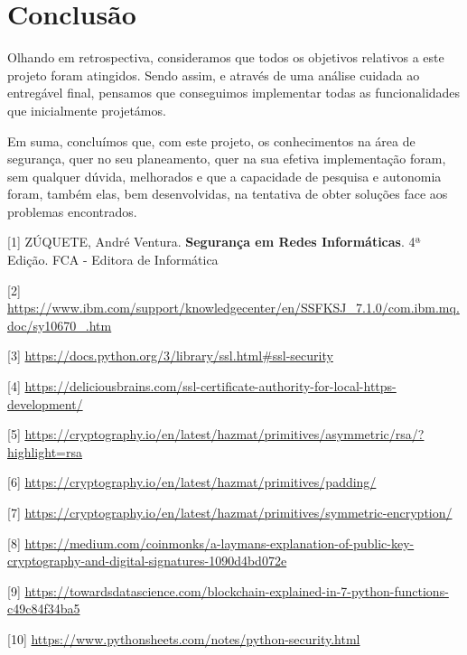 \documentclass[12pt]{article}
\begin{document}
\pagebreak

\section{Conclusão}

\par Olhando em retrospectiva, consideramos que todos os objetivos relativos a este projeto foram atingidos. Sendo assim, e através de uma análise cuidada ao entregável final, pensamos que conseguimos implementar todas as funcionalidades que inicialmente projetámos. 

\par Em suma, concluímos que, com este projeto, os conhecimentos na área de segurança, quer no seu planeamento, quer na sua efetiva implementação foram, sem qualquer dúvida, melhorados e que a capacidade de pesquisa e autonomia foram, também elas, bem desenvolvidas, na tentativa de obter soluções face aos problemas encontrados.

\pagebreak





\vspace{5mm} %


[1] ZÚQUETE, André Ventura. \textbf{Segurança em Redes Informáticas}. 4ª Edição. FCA - Editora de Informática 


[2] \url{https://www.ibm.com/support/knowledgecenter/en/SSFKSJ\_7.1.0/com.ibm.mq.doc/sy10670\_.htm}

[3] \url{https://docs.python.org/3/library/ssl.html#ssl-security}

[4] \url{https://deliciousbrains.com/ssl-certificate-authority-for-local-https-development/}

[5] \url{https://cryptography.io/en/latest/hazmat/primitives/asymmetric/rsa/?highlight=rsa}

[6] \url{https://cryptography.io/en/latest/hazmat/primitives/padding/}

[7] \url{https://cryptography.io/en/latest/hazmat/primitives/symmetric-encryption/}

[8] \url{https://medium.com/coinmonks/a-laymans-explanation-of-public-key-cryptography-and-digital-signatures-1090d4bd072e}

[9] \url{https://towardsdatascience.com/blockchain-explained-in-7-python-functions-c49c84f34ba5}

[10] \url{https://www.pythonsheets.com/notes/python-security.html}
\end{document}
